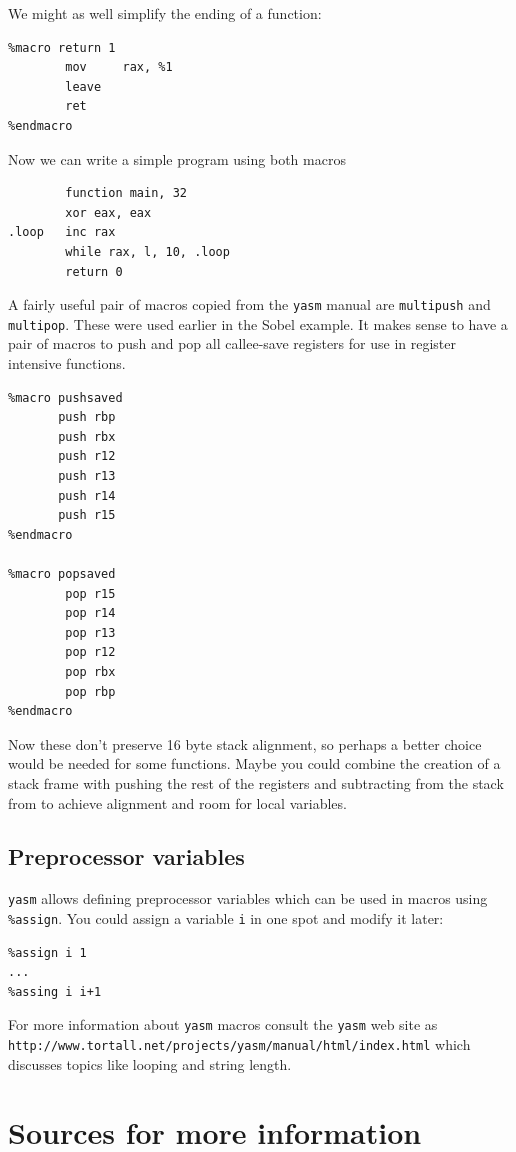 \documentclass[11pt,b5paper]{book}
\begin{document}
We might as well simplify the ending of a function:
\begin{verbatim}
%macro return 1
        mov     rax, %1
        leave
        ret
%endmacro 
\end{verbatim}

Now we can write a simple program using both macros
\begin{verbatim}
        function main, 32
        xor eax, eax
.loop   inc rax
        while rax, l, 10, .loop
        return 0
\end{verbatim}

A fairly useful pair of macros copied from the {\tt yasm} manual are
{\tt multipush} and {\tt multipop}.
These were used earlier in the Sobel example.
It makes sense to have a pair of macros to push and pop all callee-save
registers for use in register intensive functions.

\begin{verbatim}
%macro pushsaved
       push rbp
       push rbx
       push r12
       push r13
       push r14
       push r15
%endmacro

%macro popsaved
        pop r15
        pop r14
        pop r13
        pop r12
        pop rbx
        pop rbp
%endmacro
\end{verbatim}

Now these don't preserve 16 byte stack alignment, so perhaps a better choice
would be needed for some functions.
Maybe you could combine the creation of a stack frame with pushing the rest
of the registers and subtracting from the stack from to achieve alignment and
room for local variables.

\section{Preprocessor variables}
{\tt yasm} allows defining preprocessor variables which can be used in
macros using {\tt \%assign}.
You could assign a variable {\tt i} in one spot and modify it later:

\begin{verbatim}
%assign i 1
...
%assing i i+1
\end{verbatim}


For more information about {\tt yasm} macros consult the {\tt yasm} web site as\\
{\tt http://www.tortall.net/projects/yasm/manual/html/index.html}
which discusses topics like looping and string length.

\chapter{Sources for more information}
\end{document}
